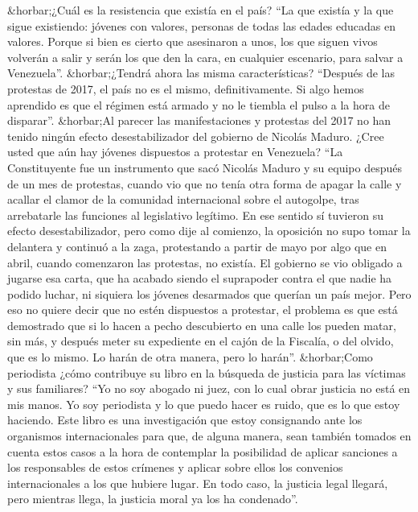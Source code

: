 \documentclass{article}%
\begin{document}
\newline%
%
\&horbar;¿Cuál es la resistencia que existía en el país?%
\newline%
%
“La que existía y la que sigue existiendo: jóvenes con valores, personas de todas las edades educadas en valores. Porque si bien es cierto que asesinaron a unos, los que siguen vivos volverán a salir y serán los que den la cara, en cualquier escenario, para salvar a Venezuela”.%
\newline%
%
\&horbar;¿Tendrá ahora las misma características?%
\newline%
%
“Después de las protestas de 2017, el país no es el mismo, definitivamente. Si algo hemos aprendido es que el régimen está armado y no le tiembla el pulso a la hora de disparar”.%
\newline%
%
\&horbar;Al parecer las manifestaciones y protestas del 2017 no han tenido ningún efecto desestabilizador del gobierno de Nicolás Maduro. ¿Cree usted que aún hay jóvenes dispuestos a protestar en Venezuela?%
\newline%
%
“La Constituyente fue un instrumento que sacó Nicolás Maduro y su equipo después de un mes de protestas, cuando vio que no tenía otra forma de apagar la calle y acallar el clamor de la comunidad internacional sobre el autogolpe, tras arrebatarle las funciones al legislativo legítimo. En ese sentido sí tuvieron su efecto desestabilizador, pero como dije al comienzo, la oposición no supo tomar la delantera y continuó a la zaga, protestando a partir de mayo por algo que en abril, cuando comenzaron las protestas, no existía. El gobierno se vio obligado a jugarse esa carta, que ha acabado siendo el suprapoder contra el que nadie ha podido luchar, ni siquiera los jóvenes desarmados que querían un país mejor. Pero eso no quiere decir que no estén dispuestos a protestar, el problema es que está demostrado que si lo hacen a pecho descubierto en una calle los pueden matar, sin más, y después meter su expediente en el cajón de la Fiscalía, o del olvido, que es lo mismo. Lo harán de otra manera, pero lo harán”.%
\newline%
%
\&horbar;Como periodista ¿cómo contribuye su libro en la búsqueda de justicia para las víctimas y sus familiares?%
\newline%
%
“Yo no soy abogado ni juez, con lo cual obrar justicia no está en mis manos. Yo soy periodista y lo que puedo hacer es ruido, que es lo que estoy haciendo. Este libro es una investigación que estoy consignando ante los organismos internacionales para que, de alguna manera, sean también tomados en cuenta estos casos a la hora de contemplar la posibilidad de aplicar sanciones a los responsables de estos crímenes y aplicar sobre ellos los convenios internacionales a los que hubiere lugar. En todo caso, la justicia legal llegará, pero mientras llega, la justicia moral ya los ha condenado”.%
\end{document}
